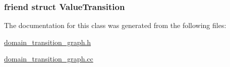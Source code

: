 \hypertarget{classDomainTransitionGraph_a14fe5a6c4d0b0fe3d17004e5a8daab2f}{
\subsubsection[{Value\-Transition}]{\setlength{\rightskip}{0pt plus 5cm}friend struct {\bf Value\-Transition}\hspace{0.3cm}{\ttfamily [friend]}}}\label{classDomainTransitionGraph_a14fe5a6c4d0b0fe3d17004e5a8daab2f}


The documentation for this class was generated from the following files\-:\begin{DoxyCompactItemize}
\item 
\hyperlink{domain__transition__graph_8h}{domain\-\_\-transition\-\_\-graph.\-h}\item 
\hyperlink{domain__transition__graph_8cc}{domain\-\_\-transition\-\_\-graph.\-cc}\end{DoxyCompactItemize}
